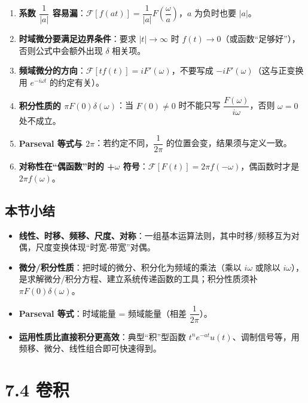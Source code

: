 \begin{enumerate}
\def\labelenumi{\arabic{enumi}.}
\tightlist
\item
  \textbf{系数 \(\dfrac{1}{|a|}\)
  容易漏}：\(\mathcal F[f(at)]=\dfrac{1}{|a|}F\left(\dfrac{\omega}{a}\right)\)，\(a\)
  为负时也要 \(|a|\)。
\item
  \textbf{时域微分要满足边界条件}：要求 \(|t|\to\infty\) 时
  \(f(t)\to0\)（或函数``足够好''），否则公式中会额外出现 \(\delta\)
  相关项。
\item
  \textbf{频域微分的方向}：\(\mathcal F[t f(t)]=iF'(\omega)\)，不要写成
  \(-iF'(\omega)\)（这与正变换用 \(e^{-i\omega t}\) 的约定有关）。
\item
  \textbf{积分性质的 \(\pi F(0)\delta(\omega)\)}：当 \(F(0)\neq0\)
  时不能只写 \(\dfrac{F(\omega)}{i\omega}\)，否则 \(\omega=0\)
  处不成立。
\item
  \textbf{Parseval 等式与 \(2\pi\)}：若约定不同，\(\dfrac{1}{2\pi}\)
  的位置会变，结果须与定义一致。
\item
  \textbf{对称性在``偶函数''时的 +\(\omega\)
  符号}：\(\mathcal F[F(t)]=2\pi f(-\omega)\)，偶函数时才是
  \(2\pi f(\omega)\)。
\end{enumerate}

\subsection{本节小结}\label{ux672cux8282ux5c0fux7ed3-19}

\begin{itemize}
\tightlist
\item
  \textbf{线性、时移、频移、尺度、对称}：一组基本运算法则，其中时移/频移互为对偶，尺度变换体现``时宽-带宽''对偶。
\item
  \textbf{微分/积分性质}：把时域的微分、积分化为频域的乘法（乘以
  \(i\omega\) 或除以
  \(i\omega\)），是求解微分/积分方程、建立系统传递函数的工具；积分性质须补
  \(\pi F(0)\delta(\omega)\)。
\item
  \textbf{Parseval 等式}：时域能量 = 频域能量（相差
  \(\dfrac{1}{2\pi}\)）。
\item
  \textbf{运用性质比直接积分更高效}：典型``积''型函数
  \(t^n e^{-at}u(t)\)、调制信号等，用频移、微分、线性组合即可快速得到。
\end{itemize}

\section{7.4 卷积}\label{ux5377ux79ef}

